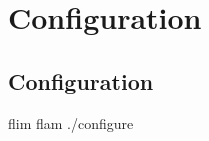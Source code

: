 \section{Configuration}
\label{group__configure}
\subsection{Configuration}\label{config}
flim flam ./configure 

